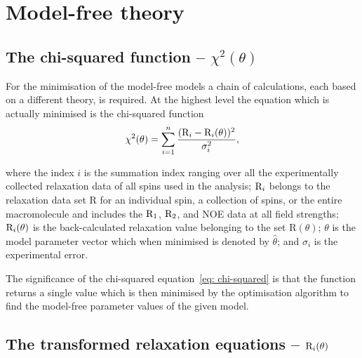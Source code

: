 
\section{Model-free theory}



\subsection{The chi-squared function -- $\chi^2(\theta)$}


For the minimisation of the model-free models a chain of calculations, each based on a different theory, is required.
At the highest level the equation which is actually minimised is the chi-squared function
\begin{equation} \label{eq: chi-squared}
 \chi^2(\theta) = \sum_{i=1}^n \frac{(\mathrm{R}_i - \mathrm{R}_i(\theta))^2}{\sigma_i^2},
\end{equation}

\noindent where the index $i$ is the summation index ranging over all the experimentally collected relaxation data of all spins used in the analysis; $\mathrm{R}_i$ belongs to the relaxation data set R for an individual spin, a collection of spins, or the entire macromolecule and includes the $\mathrm{R}_1$, $\mathrm{R}_2$, and NOE data at all field strengths; $\mathrm{R}_i(\theta)$ is the back-calculated relaxation value belonging to the set R$(\theta)$; $\theta$ is the model parameter vector which when minimised is denoted by $\hat\theta$; and $\sigma_i$ is the experimental error.

The significance of the chi-squared equation~\eqref{eq: chi-squared} is that the function returns a single value which is then minimised by the optimisation algorithm to find the model-free parameter values of the given model.



\subsection{The transformed relaxation equations -- $\mathrm{R}_i(\theta)$}

